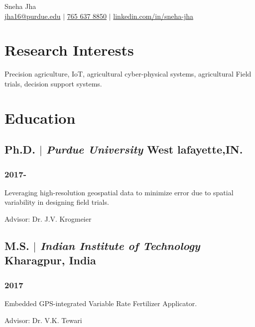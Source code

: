 \documentclass[10pt]{article}
\begin{document}
\begin{center}
    {\fontsize{20}{20} \normalfont Sneha Jha} \\ \bigskip
    {\color{icnclr}\faEnvelope[regular]} \href{mailto:jha16@purdue.edu}{jha16@purdue.edu} $|$ 
    {\color{icnclr}} \href{tel:7656378850}{765 637 8850} $|$
    {\color{icnclr}\faLinkedinIn} \href{https://www.linkedin.com/in/sneha-jha-63490054/}{linkedin.com/in/sneha-jha}
\end{center}

\section{ Research Interests}
Precision agriculture, IoT, agricultural cyber-physical systems, agricultural Field trials, decision support systems.

\section{Education}
\subsection{Ph.D. $|$ {\normalfont\textit{Purdue University}} \hfill West lafayette,IN.}
\subsubsection{\hfill 2017- }
\begin{description}
    \item Leveraging high-resolution geospatial data to minimize error due to spatial variability in designing field trials. 
    \item Advisor: Dr. J.V. Krogmeier
\end{description}

\subsection{M.S. $|$ {\normalfont\textit{Indian Institute of Technology}} \hfill Kharagpur, India}
\subsubsection{\hfill 2017}
\begin{description}
    \item  Embedded GPS-integrated Variable Rate Fertilizer Applicator.
    \item Advisor: Dr. V.K. Tewari 
\end{description}
\end{document}
